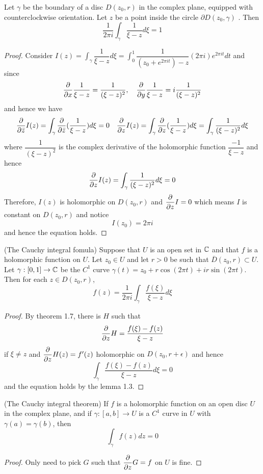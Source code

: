 \begin{lemma}
    Let $\gamma$ be the boundary of a disc $D(z_0,r)$ in the complex plane, equipped with counterclockwise orientation. Let $z$ be a point inside the circle $\partial D(z_0,\gamma)$ . Then
    \[\dfrac{1}{2\pi i} \int_{\gamma} \dfrac{1}{\xi-z}d\xi = 1\]
\end{lemma}
\begin{proof}\par
    Consider $I(z) = \int_{\gamma} \dfrac{1}{\xi-z}d\xi = \int_0^1 \dfrac{1}{(z_0+e^{2\pi it})-z}(2\pi i)e^{2\pi i t}dt$ and since
    \[\dfrac{\partial}{\partial x} \dfrac{1}{\xi-z} = \dfrac{1}{(\xi-z)^2},\quad \dfrac{\partial}{\partial y} \dfrac{1}{\xi -z} = i\dfrac{1}{(\xi-z)^2}\]
    and hence we have
    \[\dfrac{\partial}{\partial \bar{z}} I(z) = \int_{\gamma} \dfrac{\partial}{\partial \bar{z}}(\dfrac{1}{\xi-z})d\xi = 0\quad \dfrac{\partial}{\partial z} I(z) = \int_{\gamma} \dfrac{\partial}{\partial z} (\dfrac{1}{\xi-z})d\xi = \int_{\gamma}\dfrac{1}{(\xi-z)^2} d\xi\]
    where $\dfrac{1}{(\xi-z)^2}$ is the complex derivative of the holomorphic function $\dfrac{-1}{\xi-z}$ and hence 
    \[\dfrac{\partial}{\partial z} I(z) = \int_{\gamma} \dfrac{1}{(\xi-z)^2}d\xi = 0\]
    Therefore, $I(z)$ is holomorphic on $D(z_0,r)$ and $\dfrac{\partial}{\partial z} I = 0$ which means $I$ is constant on $D(z_0,r)$ and notice
    \[I(z_0) = 2\pi i\]
    and hence the equation holds.
\end{proof}

\begin{theorem}
    (The Cauchy integral fomula) Suppose that $U$ is an open set in $\mathbb{C}$ and that $f$ is a holomorphic function on $U$. Let $z_0\in U$ and let $r>0$ be such that $\overline{D}(z_0,r) \subset U$. Let $\gamma:[0,1] \to \mathbb{C}$ be the $C^1$ curve $\gamma(t)= z_0+r\cos(2\pi t) + ir \sin(2\pi t)$. Then for each $z\in D(z_0,r)$,
    \[f(z) = \dfrac{1}{2\pi i}\int_{\gamma} \dfrac{f(\xi)}{\xi-z}d\xi\] 
\end{theorem}
\begin{proof}
    By theorem 1.7, there is $H$ such that
    \[\dfrac{\partial}{\partial z} H = \dfrac{f(\xi)-f(z)}{\xi-z}\]
    if $\xi \neq z$ and $\dfrac{\partial}{\partial z} H(z) = f'(z)$ holomorphic on $D(z_0,r+\epsilon)$ and hence
    \[\int_{\gamma} \dfrac{f(\xi)-f(z)}{\xi-z}d\xi = 0\]
    and the equation holds by the lemma 1.3.
\end{proof}

\begin{theorem}
    (The Cauchy integral theorem) If $f$ is a holomorphic function on an open disc $U$ in the complex plane, and if $\gamma:[a,b] \to U$ is a $C^1$ curve in $U$ with $\gamma(a) = \gamma(b)$, then
    \[\int_{\gamma} f(z)dz = 0\]
\end{theorem}
\begin{proof}
Only need to pick $G$ such that $\dfrac{\partial}{\partial z} G = f$ on $U$ is fine.
\end{proof}

